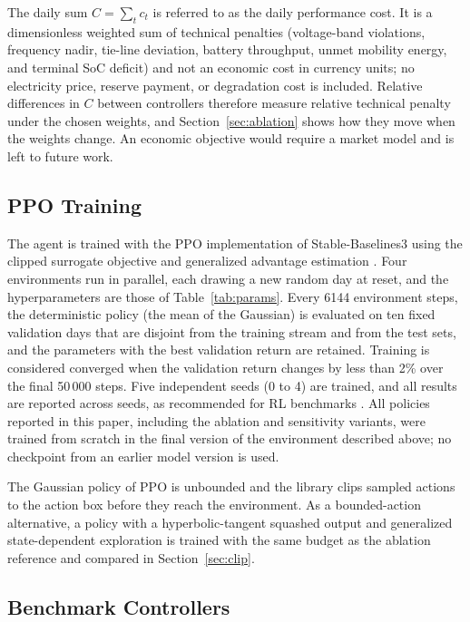 The daily sum $C=\sum_{t}c_t$ is referred to as the daily performance
cost. It is a dimensionless weighted sum of technical penalties
(voltage-band violations, frequency nadir, tie-line deviation, battery
throughput, unmet mobility energy, and terminal SoC deficit) and not
an economic cost in currency units; no electricity price, reserve
payment, or degradation cost is included. Relative differences in $C$
between controllers therefore measure relative technical penalty
under the chosen weights, and Section~\ref{sec:ablation} shows how
they move when the weights change. An economic objective would
require a market model and is left to future work.

\subsection{PPO Training}
\label{sec:ppo}

The agent is trained with the PPO implementation of Stable-Baselines3
\cite{Raffin2021} using the clipped surrogate objective
\cite{Schulman2017} and generalized advantage estimation \cite{Schulman2016}.
Four environments run in parallel, each drawing a new random day at
reset, and the hyperparameters are those of Table~\ref{tab:params}.
Every 6144 environment steps, the deterministic policy (the mean of the
Gaussian) is evaluated on ten fixed validation days that are disjoint
from the training stream and from the test sets, and the parameters
with the best validation return are retained. Training is considered
converged when the validation return changes by less than 2\% over the
final 50\,000 steps. Five independent seeds (0 to 4) are trained, and
all results are reported across seeds, as recommended for RL
benchmarks \cite{Henderson2018}. All policies reported in this paper,
including the ablation and sensitivity variants, were trained from
scratch in the final version of the environment described above; no
checkpoint from an earlier model version is used.

The Gaussian policy of PPO is unbounded and the library clips sampled
actions to the action box before they reach the environment. As a
bounded-action alternative, a policy with a hyperbolic-tangent squashed
output and generalized state-dependent exploration \cite{Raffin2022}
is trained with the same budget as the ablation reference and compared
in Section~\ref{sec:clip}.

\subsection{Benchmark Controllers}
\label{sec:bench}

